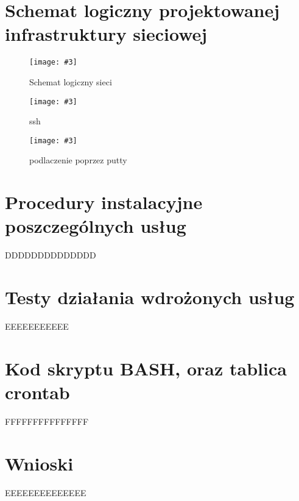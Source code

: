 \documentclass[a4paper]{article}
\newcommand*{\fg}[4][!htb]{
      \begin{figure*}[#1]
      \texttt{[image: \#3]}
      \caption{#4}
      \end{figure*}
}
\begin{document}
\section{Schemat logiczny projektowanej infrastruktury sieciowej}
\fg{width=\textwidth}{contents/VirtualBox-network-setup/setup.png}{Schemat logiczny sieci}
\newpage

\fg{width=\textwidth}{contents/configuration/SSH/1.png}{ssh}
\fg{width=\textwidth}{contents/configuration/SSH/2.png}{podlaczenie poprzez putty}
\section{Procedury instalacyjne poszczególnych usług}
DDDDDDDDDDDDDD
\section{Testy działania wdrożonych usług}
EEEEEEEEEEE
\section{Kod skryptu BASH, oraz tablica crontab}
FFFFFFFFFFFFFFF
\section{Wnioski}
EEEEEEEEEEEEEE
\newpage
\nocite{k8s-docs}
\nocite{k8s-blog}
\nocite{k8s-github}
\printbibliography[heading=bibnumbered, label=Literatura, title=Literatura]
\end{document}
